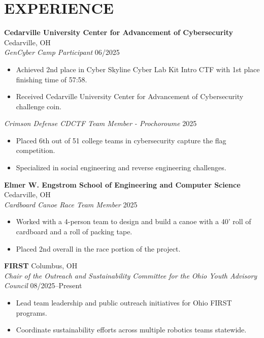 \documentclass[a4paper,10pt]{article}
\begin{document}
\section{EXPERIENCE}

\textbf{Cedarville University Center for Advancement of Cybersecurity} \hfill Cedarville, OH\\
\textit{GenCyber Camp Participant} \hfill 06/2025
\begin{itemize}[nosep,after=\strut, leftmargin=1em, itemsep=3pt,label=--]
\item Achieved 2nd place in Cyber Skyline Cyber Lab Kit Intro CTF with 1st place finishing time of 57:58.
\item Received Cedarville University Center for Advancement of Cybersecurity challenge coin.
\end{itemize}

\textit{Crimson Defense CDCTF Team Member - Prochoroume} \hfill 2025
\begin{itemize}[nosep,after=\strut, leftmargin=1em, itemsep=3pt,label=--]
\item Placed 6th out of 51 college teams in cybersecurity capture the flag competition.
\item Specialized in social engineering and reverse engineering challenges.
\end{itemize}

\textbf{Elmer W. Engstrom School of Engineering and Computer Science} \hfill Cedarville, OH\\
\textit{Cardboard Canoe Race Team Member} \hfill 2025
\begin{itemize}[nosep,after=\strut, leftmargin=1em, itemsep=3pt,label=--]
\item Worked with a 4-person team to design and build a canoe with a 40' roll of cardboard and a roll of packing tape.
\item Placed 2nd overall in the race portion of the project.
\end{itemize}

\textbf{FIRST} \hfill Columbus, OH\\
\textit{Chair of the Outreach and Sustainability Committee for the Ohio Youth Advisory Council} \hfill 08/2025--Present
\begin{itemize}[nosep,after=\strut, leftmargin=1em, itemsep=3pt,label=--]
\item Lead team leadership and public outreach initiatives for Ohio FIRST programs.
\item Coordinate sustainability efforts across multiple robotics teams statewide.
\end{itemize}
\end{document}
